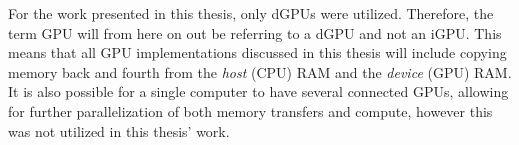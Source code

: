 For the work presented in this thesis, only dGPUs were utilized. 
Therefore, the term GPU will from here on out be referring to a dGPU and not an iGPU.
This means that all GPU implementations discussed in this thesis will include copying memory back and fourth from the \textit{host} (CPU) RAM and the \textit{device} (GPU) RAM.
It is also possible for a single computer to have several connected GPUs, allowing for further parallelization of both memory transfers and compute, however this was not utilized in this thesis' work.

